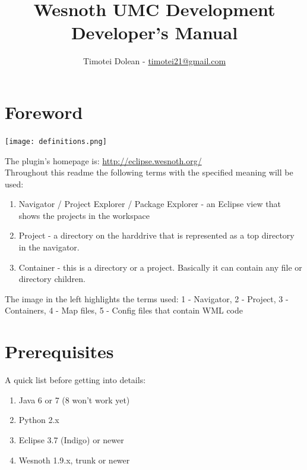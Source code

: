 \documentclass[10pt]{article}
\title{Wesnoth UMC Development \\ Developer's Manual}
\author{Timotei Dolean - \href{mailto:timotei21@gmail.com}{timotei21@gmail.com}}
\begin{document}
\maketitle

\tableofcontents
\setcounter{tocdepth}{3}
\newpage

\newcommand{\icnt}{ \stepcounter{cnt} \thecnt }

\section{Foreword}
\begin{multicols}{2}
 \begin{center}
    \texttt{[image: definitions.png]}
 \end{center}

The plugin's homepage is: \url{http://eclipse.wesnoth.org/} \\

Throughout this readme the following terms with the specified meaning will be used:
\begin{enumerate}
\item Navigator / Project Explorer / Package Explorer - an Eclipse view that shows the projects in the workspace
\item Project - a directory on the harddrive that is represented as a top directory in the navigator.
\item Container - this is a directory or a project. Basically it can contain any file or directory children.
\end{enumerate}

The image in the left highlights the terms used: 1 - Navigator, 2 - Project, 3 - Containers, 4 - Map files, 5 - Config files that contain WML code
\end{multicols}

\section{Prerequisites}
A quick list before getting into details:
\begin{enumerate}
\item Java 6 or 7 (8 won't work yet)
\item Python 2.x
\item Eclipse 3.7 (Indigo) or newer
\item Wesnoth 1.9.x, trunk or newer
\end{enumerate}
\end{document}

